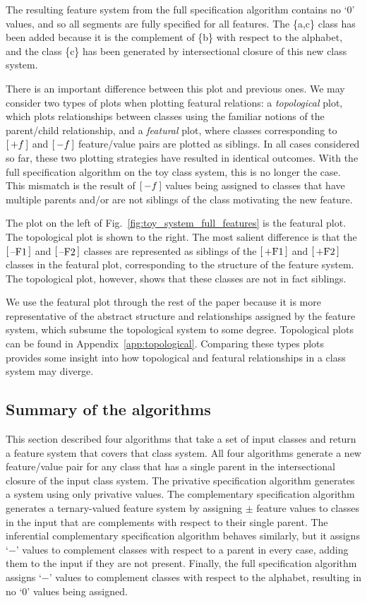 \documentclass[12pt, oneside]{article}   	%
\newcommand{\featmat}[1]
{$\begin{bsmallmatrix*}[l]\text{\normalsize #1}\end{bsmallmatrix*}$}
\begin{document}
The resulting feature system from the full specification algorithm contains no `0' values, and so all segments are fully specified for all features. The \{a,c\} class has been added because it is the complement of \{b\} with respect to the alphabet, and the class \{c\} has been generated by intersectional closure of this new class system.

There is an important difference between this plot and previous ones. We may consider two types of plots when plotting featural relations: a \emph{topological} plot, which plots relationships between classes using the familiar notions of the parent/child relationship, and a \emph{featural} plot, where classes corresponding to \featmat{$+f$} and \featmat{$-f$} feature/value pairs are plotted as siblings. In all cases considered so far, these two plotting strategies have resulted in identical outcomes. With the full specification algorithm on the toy class system, this is no longer the case. This mismatch is the result of \featmat{$-f$} values being assigned to classes that have multiple parents and/or are not siblings of the class motivating the new feature.

The plot on the left of Fig.~\ref{fig:toy_system_full_features} is the featural plot. The topological plot is shown to the right. The most salient difference is that the \featmat{--F1} and \featmat{--F2} classes are represented as siblings of the \featmat{+F1} and \featmat{+F2} classes in the featural plot, corresponding to the structure of the feature system. The topological plot, however, shows that these classes are not in fact siblings.

We use the featural plot through the rest of the paper because it is more representative of the abstract structure and relationships assigned by the feature system, which subsume the topological system to some degree. Topological plots can be found in Appendix~\ref{app:topological}. Comparing these types plots provides some insight into how topological and featural relationships in a class system may diverge.

\subsection{Summary of the algorithms}

This section described four algorithms that take a set of input classes and return a feature system that covers that class system. All four algorithms generate a new feature/value pair for any class that has a single parent in the intersectional closure of the input class system. The privative specification algorithm generates a system using only privative values. The complementary specification algorithm generates a ternary-valued feature system by assigning $\pm$ feature values to classes in the input that are complements with respect to their single parent. The inferential complementary specification algorithm behaves similarly, but it assigns `$-$' values to complement classes with respect to a parent in every case, adding them to the input if they are not present. Finally, the full specification algorithm assigns `$-$' values to complement classes with respect to the alphabet, resulting in no `0' values being assigned.
\end{document}
